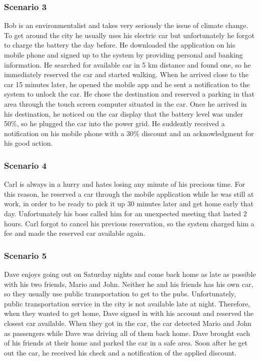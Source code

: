 \subsubsection{Scenario 3}
Bob is an environmentalist and takes very seriously the issue of climate change. To get around the city he usually uses his electric car but unfortunately he forgot to charge the battery the day before. He downloaded the application on his mobile phone and signed up to the system by providing personal and banking information. He searched for available car in 5 km distance and found one, so he immediately reserved the car and started walking. When he arrived close to the car 15 minutes later, he opened the mobile app and he sent a notification to the system to unlock the car. He chose the destination and reserved a parking in that area through the touch screen computer situated in the car. Once he arrived in his destination, he noticed on the car display that the battery level was under 50\%, so he plugged the car into the power grid. He suddently received a notification on his mobile phone with a 30\% discount and an acknowledgment for his good action.

\subsubsection{Scenario 4}
Carl is always in a hurry and hates losing any minute of his precious time. For this reason, he reserved a car through the mobile application while he was still at work, in order to be ready to pick it up 30 minutes later and get home early that day. Unfortunately his boss called him for an unexpected meeting that lasted 2 hours. Carl forgot to cancel his previous reservation, so the system charged him a fee and made the reserved car available again.

\subsubsection{Scenario 5}
Dave enjoys going out on Saturday nights and come back home as late as possible with his two friends, Mario and John.  Neither he and his friends has his own car, so they usually use public transportation to get to the pubs. Unfortunately, public transportation service in the city is not available late at night. Therefore, when they wanted to get home, Dave signed in with his account and reserved the closest car available. When they got in the car, the car detected Mario and John as passengers while Dave was driving all of them back home. Dave brought each of his friends at their home and parked the car in a safe area. Soon after he get out the car, he received his check and a notification of the applied discount.

